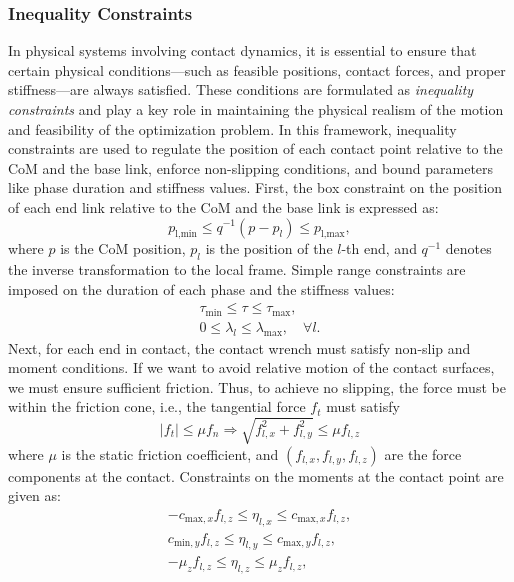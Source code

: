 \documentclass[main.tex]{subfiles}
\begin{document}
\subsubsection{Inequality Constraints}
In physical systems involving contact dynamics, it is essential to ensure that certain physical conditions—such as feasible positions, contact forces, and proper stiffness—are always satisfied. These conditions are formulated as \textit{inequality constraints} and play a key role in maintaining the physical realism of the motion and feasibility of the optimization problem.
In this framework, inequality constraints are used to regulate the position of each contact point relative to the CoM and the base link, enforce non-slipping conditions, and bound parameters like phase duration and stiffness values.
First, the box constraint on the position of each end link relative to the CoM and the base link is expressed as:
\begin{equation}
p_{\text{l,min}} \leq q^{-1}(p - p_l) \leq p_{\text{l,max}},
\end{equation}
where $p$ is the CoM position, $p_l$ is the position of the $l$-th end, and $q^{-1}$ denotes the inverse transformation to the local frame.
Simple range constraints are imposed on the duration of each phase and the stiffness values:
\begin{align}
\tau_{\text{min}} \leq \tau \leq \tau_{\text{max}}, \\
0 \leq \lambda_l \leq \lambda_{\text{max}}, \quad \forall l.
\end{align}
Next, for each end in contact, the contact wrench must satisfy non-slip and moment conditions.  
If we want to avoid relative motion of the contact surfaces, we must ensure sufficient friction. Thus, to achieve no slipping, the force must be within the friction cone, i.e., the tangential force $f_t$ must satisfy 
\begin{equation}
    \lvert f_t \rvert \leq \mu f_n  \Longrightarrow \sqrt{f_{l,x}^2 + f_{l,y}^2} \leq \mu f_{l,z}
\end{equation}
where $\mu$ is the static friction coefficient, and $(f_{l,x}, f_{l,y}, f_{l,z})$ are the force components at the contact.
Constraints on the moments at the contact point are given as:
\begin{align}
-c_{\text{max},x} f_{l,z} \leq \eta_{l,x} \leq c_{\text{max},x} f_{l,z}, \\
c_{\text{min},y} f_{l,z} \leq \eta_{l,y} \leq c_{\text{max},y} f_{l,z}, \\
-\mu_z f_{l,z} \leq \eta_{l,z} \leq \mu_z f_{l,z},
\end{align}
\end{document}
